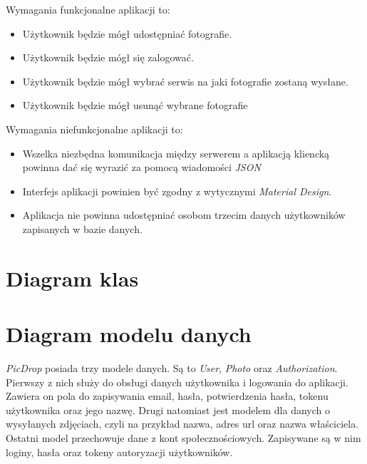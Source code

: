 \documentclass[brudnopis]{xmgr}
\begin{document}
 Wymagania funkcjonalne aplikacji to: 
\begin{itemize}
  \item Użytkownik będzie mógł udostępniać fotografie. 
  \item Użytkownik będzie mógł się zalogować.
  \item Użytkownik będzie mógł wybrać serwis na jaki fotografie zostaną wysłane.
  \item Użytkownik będzie mógł usunąć wybrane fotografie
\end{itemize}

Wymagania niefunkcjonalne aplikacji to: 
\begin{itemize}
  \item Wszelka niezbędna komunikacja między serwerem a aplikacją kliencką powinna dać się wyrazić za pomocą wiadomości \textit{JSON}
  \item Interfejs aplikacji powinien być zgodny z wytycznymi \textit{Material Design}.
  \item Aplikacja nie powinna udostępniać osobom trzecim danych użytkowników zapisanych w bazie danych.
\end{itemize}
  
\section{Diagram klas}

\section{Diagram modelu danych}
\textit{PicDrop} posiada trzy modele danych. Są to \textit{User}, \textit{Photo} oraz \textit{Authorization}. Pierwszy z nich służy do obsługi danych użytkownika i logowania do aplikacji. Zawiera on pola do zapisywania email, hasła, potwierdzenia hasła, tokenu użytkownika oraz jego nazwę. Drugi natomiast jest modelem dla danych o wysyłanych zdjęciach, czyli na przykład nazwa, adres url oraz nazwa właściciela. Ostatni model przechowuje dane z kont społecznościowych. Zapisywane są w nim loginy, hasła oraz tokeny autoryzacji użytkowników. 
\end{document}
